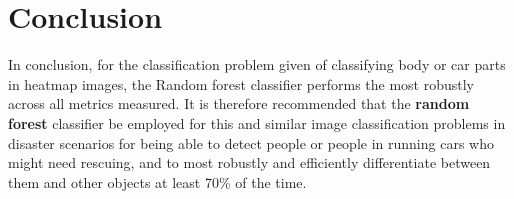 \documentclass[journal,twocolumn,12pt,twoside]{IEEEtran}
\begin{document}
\section{Conclusion}
In conclusion, for the classification problem given of classifying body or car parts in heatmap images, the Random forest classifier performs the most robustly across all metrics measured. It is therefore recommended that the \textbf{random forest} classifier be employed for this and similar image classification problems in disaster scenarios for being able to detect people or people in running cars who might need rescuing, and to most robustly and efficiently differentiate between them and other objects at least 70\% of the time.


% 
\end{document}
